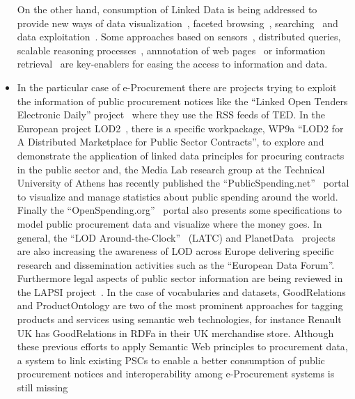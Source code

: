 \begin{itemize}
 On the other hand, consumption of Linked Data is being addressed to provide new ways of data 
 visualization~\cite{DBLP:journals/semweb/DadzieR11,hoga-etal-2011-swse-JWS}, faceted browsing~\cite{Pietriga06fresnel, citeulike:8529753,Sparallax}, 
 searching~\cite{hoga-etal-2011-swse-JWS} and data exploitation~\cite{Harth:2011:SIP:1963192.1963318}. Some approaches 
 based on sensors~\cite{Jeung:2010:EMM:1850003.1850235,ontology-search}, distributed queries\cite{Hartig09executingsparql,Ankolekar07thetwo,sparqlOpt}, 
 scalable reasoning processes~\cite{Urbani2010WebPIE,HoganHarthPolleres2009,DBLP:conf/semweb/HoganPPD10}, 
 annnotation of web pages~\cite{rdfa-primer} or information retrieval~\cite{Pound} are key-enablers for easing the access 
 to information and data.
  
 \item In the particular case of e-Procurement there are projects trying to exploit the 
 information of public procurement notices like the ``Linked Open Tenders Electronic Daily'' project~\cite{loted} 
 where they use the RSS feeds of TED. In the European project LOD2~\cite{lod2-project}, there is a specific workpackage, 
 WP9a ``LOD2 for A Distributed Marketplace for Public Sector Contracts'', to explore and demonstrate the 
 application of linked data principles for procuring contracts in the public sector and, 
 the Media Lab research group at the Technical University of Athens has recently published the 
 ``PublicSpending.net''~\cite{publicspending} portal to visualize and manage statistics about public spending around the world. 
 Finally the ``OpenSpending.org''~\cite{open-spending} portal also presents some specifications to model public procurement data and 
 visualize where the money goes. In general, the ``LOD Around-the-Clock''~\cite{latc-project} (LATC) and PlanetData~\cite{planet-data-project} 
 projects are also increasing the awareness of LOD across Europe delivering specific research and dissemination activities such as the 
 ``European Data Forum''. Furthermore legal aspects of public sector information are being reviewed in the 
 LAPSI project~\cite{lapsi-project}. In the case of vocabularies and datasets, GoodRelations and ProductOntology are two of 
 the most prominent approaches for tagging products and services using semantic web technologies, 
 for instance Renault UK has GoodRelations in RDFa in their UK merchandise store. Although these previous efforts to apply Semantic Web 
 principles to procurement data, a system to link existing PSCs to enable a better consumption of 
 public procurement notices and interoperability among e-Procurement systems is still missing 

\end{itemize}

